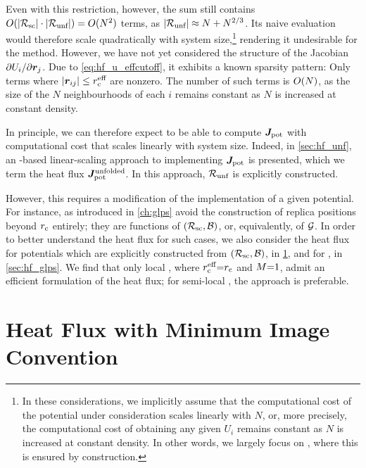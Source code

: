 Even with this restriction, however, the sum still contains $O(|\mathcal{R_{\text{sc}}}| \cdot |\mathcal{R_{\text{unf}}}|) = O(N^2)$ terms, as $|\mathcal{R_{\text{unf}}}| \approx N + N^{2/3}$.
Its naive evaluation would therefore scale quadratically with system size,\footnote{In these considerations, we implicitly assume that the computational cost of the potential under consideration scales linearly with $N$, or, more precisely, the computational cost of obtaining any given $U_i$ remains constant as $N$ is increased at constant density. In other words, we largely focus on \glps, where this is ensured by construction.} rendering it undesirable for the \gk method.
However, we have not yet considered the structure of the Jacobian $\partial U_{i} / \partial \boldsymbol{r}_{j}$.
Due to \cref{eq:hf_u_effcutoff}, it exhibits a known sparsity pattern: Only terms where $|\boldsymbol{r}_{ij}| \leq r_{\text{c}}^{\text{eff}}$ are nonzero. The number of such terms is $O(N)$, as the size of the $N$ neighbourhoods of each $i$ remains constant as $N$ is increased at constant density.

In principle, we can therefore expect to be able to compute $\boldsymbol{J}_\text{pot}$ with computational cost that scales linearly with system size.
Indeed, in \cref{sec:hf_unf}, an \ad-based linear-scaling approach to implementing $\boldsymbol{J}_\text{pot}$ is presented, which we term the  heat flux $\boldsymbol{J}^{\text{unfolded}}_\text{pot}$. In this approach, $\mathcal{R_{\text{unf}}}$ is explicitly constructed.

However, this requires a modification of the implementation of a given potential.
For instance, \glps as introduced in \cref{ch:glps} avoid the construction of replica positions beyond $r_{\text{c}}$ entirely; they are functions of $(\mathcal{R_{\text{sc}}}, \mathcal{B})$, or, equivalently, of $\mathcal{G}$.
In order to better understand the heat flux for such cases, we also consider the heat flux for potentials which are explicitly constructed from $(\mathcal{R_{\text{sc}}}, \mathcal{B})$, in \cref{sec:hf_mic}, and for \glps, in \cref{sec:hf_glps}. We find that only local \glps, where $r_{\text{c}}^{\text{eff}}{=}r_{\text{c}}$ and $M{=}1$, admit an efficient formulation of the heat flux; for semi-local \glps, the  approach is preferable.


\section{Heat Flux with Minimum Image Convention}
\label{sec:hf_mic}

